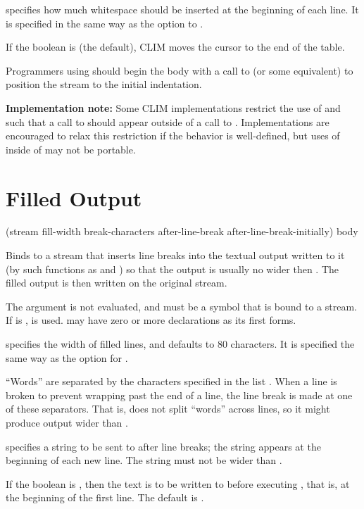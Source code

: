  specifies how much whitespace should be inserted at the
beginning of each line.  It is specified in the same way as the 
option to .

If the boolean  is  (the default), CLIM moves the
cursor to the end of the table.

Programmers using  should begin the body with a call to
 (or some equivalent) to position the stream to the initial
indentation.

{\bf Implementation note:} Some CLIM implementations restrict the use of
 and  such that a call to
 should appear outside of a call to .
Implementations are encouraged to relax this restriction if the behavior is
well-defined, but uses of  inside of 
may not be portable.


\section {Filled Output}

 {(stream \key fill-width break-characters
                                         after-line-break after-line-break-initially) 
                            \body body}

Binds  to a stream that inserts line breaks into the textual output
written to it (by such functions as  and ) so
that the output is usually no wider then .  The filled output is
then written on the original stream.

The  argument is not evaluated, and must be a symbol that is bound
to a stream.  If  is ,  is used.
 may have zero or more declarations as its first forms.

 specifies the width of filled lines, and defaults to 80
characters.  It is specified the same way as the  option for
.

``Words'' are separated by the characters specified in the list
.  When a line is broken to prevent wrapping past the end
of a line, the line break is made at one of these separators.  That is,
 does not split ``words'' across lines, so it might produce
output wider than .

 specifies a string to be sent to  after line
breaks; the string appears at the beginning of each new line.  The string must
not be wider than .

If the boolean  is , then the
 text is to be written to  before executing
, that is, at the beginning of the first line.  The default is
.
